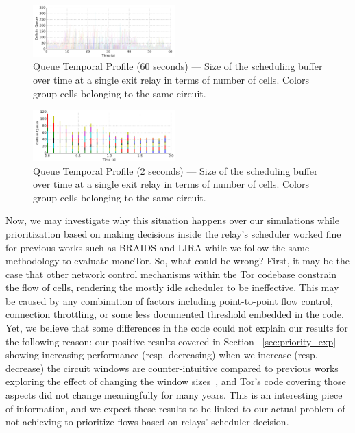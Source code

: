 \begin{figure} \centering
  \includegraphics[width=0.49\textwidth]{images/scheduling_far.png}
  \caption[Queue Temporal Profile (60 seconds)]{Queue Temporal Profile (60
    seconds) --- Size of the scheduling buffer over time at a single exit relay
    in terms of number of cells. Colors group cells belonging to the same
    circuit.}
  \label{fig:scheduling_far}
\end{figure}

\begin{figure} \centering
  \includegraphics[width=0.49\textwidth]{images/scheduling_close.png}
  \caption[Queue Temporal Profile (2 seconds)]{Queue Temporal Profile (2
    seconds) --- Size of the scheduling buffer over time at a single exit relay
    in terms of number of cells. Colors group cells belonging to the same
    circuit.}
  \label{fig:scheduling_close}
\end{figure}

Now, we may investigate why this situation happens over our simulations while prioritization based on making decisions inside the relay's scheduler worked fine for previous works such as BRAIDS and LIRA while we follow the same methodology to evaluate moneTor.
So, what could be wrong?
First, it may be the case that other network control mechanisms within the Tor codebase constrain the flow of cells, rendering the mostly idle scheduler to be ineffective.
This may be caused by any combination of factors including point-to-point flow control, connection throttling, or some less documented threshold embedded in the code.
Yet, we believe that some differences in the code could not explain our results for the following reason: our positive results covered in Section~ \ref{sec:priority_exp} showing increasing performance (resp.
decreasing) when we increase (resp.
decrease) the circuit windows are counter-intuitive compared to previous works exploring the effect of changing the window sizes~\cite{archive-2009-mail, kiraly2008solving, dingledine2009performance}, and Tor's code covering those aspects did not change meaningfully for many years.
This is an interesting piece of information, and we expect these results to be linked to our actual problem of not achieving to prioritize flows based on relays' scheduler decision.

